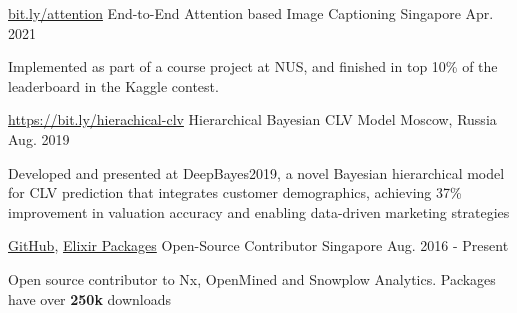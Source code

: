 \begin{cventries}
  \cventry
    {\href{https://bit.ly/attention-image-captioning}{bit.ly/attention}}
    {End-to-End Attention based Image Captioning} %
    {Singapore} %
    {Apr. 2021} %
    {
      \begin{cvitems} %
        \item {Implemented as part of a course project at NUS, and finished in top 10\% of the leaderboard in the Kaggle contest. }
      \end{cvitems}
    }

  \cventry
    {\href{https://bit.ly/attention-image-captioning}{https://bit.ly/hierachical-clv}}
    {Hierarchical Bayesian CLV Model } %
    {Moscow, Russia} %
    {Aug. 2019} %
    {
      \begin{cvitems} %
        \item {Developed and presented at DeepBayes2019, a novel Bayesian hierarchical model for CLV prediction that integrates customer demographics, achieving 37\% improvement in valuation accuracy and enabling data-driven marketing strategies }
      \end{cvitems}
    }

  \cventry
    {\href{https://github.com/goodhamgupta}{GitHub}, \href{https://bit.ly/elixir-packages}{Elixir Packages}}
    {Open-Source Contributor} %
    {Singapore} %
    {Aug. 2016 - Present} %
    {
      \begin{cvitems} %
        \item {Open source contributor to Nx, OpenMined and Snowplow Analytics. Packages have over \textbf{250k} downloads}
      \end{cvitems}
    }


\end{cventries}
